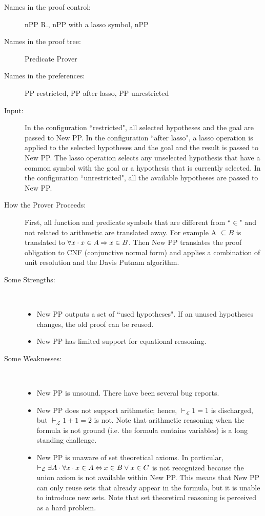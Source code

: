 \begin{description}
	\item[Names in the proof control:] nPP R., nPP with a lasso symbol, nPP
	\item[Names in the proof tree:] Predicate Prover
	\item[Names in the preferences:] PP restricted, PP after lasso, PP unrestricted
	\item[Input:] In the configuration ``restricted", all selected hypotheses and the goal are passed to New PP. In the configuration ``after lasso", a lasso operation is applied to the selected hypotheses and the goal and the result is passed to New PP. The lasso operation selects any unselected hypothesis that have a common symbol with the goal or a hypothesis that is currently selected. In the configuration ``unrestricted", all the available hypotheses are passed to New PP.
	\item[How the Prover Proceeds:] First, all function and predicate symbols that are different from ``$\in$" and not related to arithmetic are translated away. For example A $\subseteq B$ is translated to $\forall x\cdot x \in A \mathbin\Rightarrow x \in B$. Then New PP translates the proof obligation to CNF (conjunctive normal form) and applies a combination of unit resolution and the Davis Putnam algorithm.
	\item[Some Strengths:] ~
	\begin{itemize}
		\item New PP outputs a set of ``used hypotheses". If an unused hypotheses changes, the old proof can be reused.
		\item New PP has limited support for equational reasoning. 
	\end{itemize}
	\item[Some Weaknesses:] ~
	\begin{itemize}
		\item New PP is unsound. There have been several bug reports.
		\item New PP does not support arithmetic; hence, $\vdash_{\mathcal L} 1=1$ is discharged, but $\vdash_{\mathcal L} 1+1=2$ is not. Note that arithmetic 	reasoning when the formula is not ground (i.e. the formula contains variables) is a long standing challenge.
		\item New PP is unaware of set theoretical axioms. In particular, $\vdash_{\mathcal L} \exists A\cdot \forall x\cdot x \in A \mathbin\Leftrightarrow x \in B \lor x \in C$ is not recognized because the union axiom is not available within New PP. This means that New PP can only reuse sets that already appear in the formula, but it is unable to introduce new sets. Note that set theoretical reasoning is perceived as a hard problem.

\end{itemize}
\end{description}
